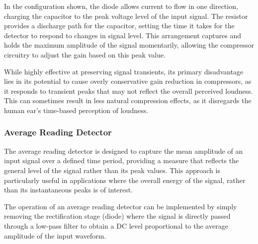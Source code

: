 \documentclass[10pt]{article}
\begin{document}
\begin{multicols*}{2}
                    \vspace{2ex}

                    \noindent In the configuration shown, the diode allows current to flow in one direction, charging the capacitor to the peak voltage level of the input signal. The resistor provides a discharge path for the capacitor, setting the time it takes for the detector to respond to changes in signal level. This arrangement captures and holds the maximum amplitude of the signal momentarily, allowing the compressor circuitry to adjust the gain based on this peak value.\par

                    While highly effective at preserving signal transients, its primary disadvantage lies in its potential to cause overly conservative gain reduction in compressors, as it responds to transient peaks that may not reflect the overall perceived loudness. This can sometimes result in less natural compression effects, as it disregards the human ear's time-based perception of loudness.  
                    
                \subsubsection{Average Reading Detector}
                    The average reading detector is designed to capture the mean amplitude of an input signal over a defined time period, providing a measure that reflects the general level of the signal rather than its peak values. This approach is particularly useful in applications where the overall energy of the signal, rather than its instantaneous peaks is of interest.\par
                    The operation of an average reading detector can be implemented by simply removing the rectification stage (diode) where the signal is directly passed through a low-pass filter to obtain a DC level proportional to the average amplitude of the input waveform. 
                

\end{multicols*}
\end{document}
